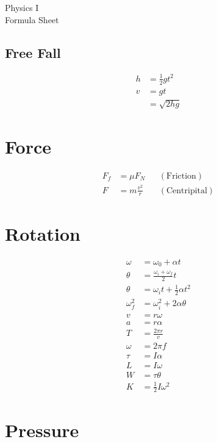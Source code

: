 \documentclass[10pt]{article}
\begin{document}
\begin{multicols*}{4}
\begin{center}
    \Large
    Physics \textrm{I} \\
    Formula Sheet
\end{center}

\subsection{Free Fall}

\begin{align*}
    h &= \frac{1}{2}gt^2\\
    v &= gt\\
      &= \sqrt{2hg}
\end{align*}

\section{Force}

\begin{align*}
    F_f &= \mu F_N && (\text{Friction})\\
    F &= m \frac{v^2}{r} && (\text{Centripital})
\end{align*}

\section{Rotation}

\begin{align*}
    \omega     &= \omega_0 + \alpha t\\
    \theta     &= \frac{\omega_i + \omega_f}{2} t\\
    \theta     &= \omega_it + \tfrac{1}{2}\alpha t^2\\
    \omega_f^2 &= \omega_i^2 + 2 \alpha \theta\\
    v          &= r\omega\\
    a          &= r\alpha\\
    T          &= \frac{2\pi r}{v}\\
    \omega     &= 2\pi f\\
    \tau       &= I\alpha\\
    L          &= I\omega\\
    W          &= \tau \theta\\
    K          &= \tfrac{1}{2}I\omega^2
\end{align*}

\section{Pressure}


\end{multicols*}
\end{document}
